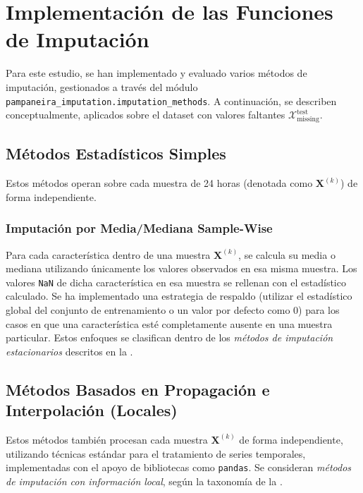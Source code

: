 \section{Implementación de las Funciones de Imputación}
\label{sec:impl_method_details_revised}
Para este estudio, se han implementado y evaluado varios métodos de imputación, gestionados a través del módulo \texttt{pampaneira\_imputation.imputation\_methods}. A continuación, se describen conceptualmente, aplicados sobre el dataset con valores faltantes $\mathcal{X}_{\text{missing}}^{\text{test}}$.

\subsection{Métodos Estadísticos Simples}
\label{subsec:metodos_estadisticos_simples}
Estos métodos operan sobre cada muestra de 24 horas (denotada como $\mathbf{X}^{(k)}$) de forma independiente.

\subsubsection*{Imputación por Media/Mediana Sample-Wise}
Para cada característica dentro de una muestra $\mathbf{X}^{(k)}$, se calcula su media o mediana utilizando únicamente los valores observados en esa misma muestra. Los valores \texttt{NaN} de dicha característica en esa muestra se rellenan con el estadístico calculado. Se ha implementado una estrategia de respaldo (utilizar el estadístico global del conjunto de entrenamiento o un valor por defecto como $0$) para los casos en que una característica esté completamente ausente en una muestra particular. Estos enfoques se clasifican dentro de los \textit{métodos de imputación estacionarios} descritos en la .

\subsection{Métodos Basados en Propagación e Interpolación (Locales)}
\label{subsec:metodos_propagacion_interpolacion}
Estos métodos también procesan cada muestra $\mathbf{X}^{(k)}$ de forma independiente, utilizando técnicas estándar para el tratamiento de series temporales, implementadas con el apoyo de bibliotecas como \texttt{pandas}. Se consideran \textit{métodos de imputación con información local}, según la taxonomía de la .

